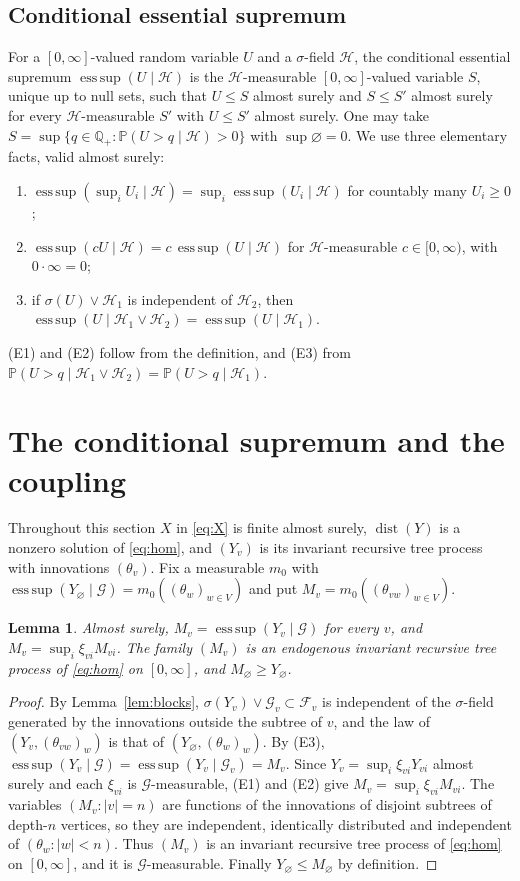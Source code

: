 \documentclass[11pt]{amsart}
\newtheorem{lemma}[theorem]{Lemma}
\theoremstyle{remark}
\newcommand{\Ga}{\mathcal{G}}
\newcommand{\cF}{\mathcal{F}}
\newcommand{\cH}{\mathcal{H}}
\newcommand{\Q}{\mathbb{Q}}
\newcommand{\Pb}{\mathbb{P}}
\newcommand{\esssup}{\operatorname*{ess\,sup}}
\newcommand{\dist}{\operatorname{dist}}
\begin{document}
\subsection{Conditional essential supremum}
For a $[0,\infty]$-valued random variable $U$ and a $\sigma$-field $\cH$, the conditional
essential supremum $\esssup(U\mid\cH)$ is the $\cH$-measurable $[0,\infty]$-valued
variable $S$, unique up to null sets, such that $U\le S$ almost surely and $S\le S'$
almost surely for every $\cH$-measurable $S'$ with $U\le S'$ almost surely. One may take
$S=\sup\{q\in\Q_+:\Pb(U>q\mid\cH)>0\}$ with $\sup\varnothing=0$. We use three elementary
facts, valid almost surely:
\begin{enumerate}
\item[(E1)] $\esssup(\sup_i U_i\mid\cH)=\sup_i\esssup(U_i\mid\cH)$ for countably many
$U_i\ge0$;
\item[(E2)] $\esssup(cU\mid\cH)=c\,\esssup(U\mid\cH)$ for $\cH$-measurable
$c\in[0,\infty)$, with $0\cdot\infty=0$;
\item[(E3)] if $\sigma(U)\vee\cH_1$ is independent of $\cH_2$, then
$\esssup(U\mid\cH_1\vee\cH_2)=\esssup(U\mid\cH_1)$.
\end{enumerate}
(E1) and (E2) follow from the definition, and (E3) from
$\Pb(U>q\mid\cH_1\vee\cH_2)=\Pb(U>q\mid\cH_1)$.

\section{The conditional supremum and the coupling}\label{sec:proof}

Throughout this section $X$ in \eqref{eq:X} is finite almost surely, $\dist(Y)$ is a
nonzero solution of \eqref{eq:hom}, and $(Y_v)$ is its invariant recursive tree process
with innovations $(\theta_v)$. Fix a measurable $m_0$ with
$\esssup(Y_\varnothing\mid\Ga)=m_0((\theta_w)_{w\in V})$ and put
$M_v=m_0((\theta_{vw})_{w\in V})$.

\begin{lemma}\label{lem:M}
Almost surely, $M_v=\esssup(Y_v\mid\Ga)$ for every $v$, and
$M_v=\sup_i\xi_{vi}M_{vi}$. The family $(M_v)$ is an endogenous invariant recursive tree
process of \eqref{eq:hom} on $[0,\infty]$, and $M_\varnothing\ge Y_\varnothing$.
\end{lemma}

\begin{proof}
By Lemma~\ref{lem:blocks}, $\sigma(Y_v)\vee\Ga_v\subset\cF_v$ is independent of the
$\sigma$-field generated by the innovations outside the subtree of $v$, and the law of
$(Y_v,(\theta_{vw})_w)$ is that of $(Y_\varnothing,(\theta_w)_w)$. By (E3),
$\esssup(Y_v\mid\Ga)=\esssup(Y_v\mid\Ga_v)=M_v$. Since
$Y_v=\sup_i\xi_{vi}Y_{vi}$ almost surely and each $\xi_{vi}$ is $\Ga$-measurable, (E1)
and (E2) give $M_v=\sup_i\xi_{vi}M_{vi}$. The variables $(M_v:|v|=n)$ are functions of
the innovations of disjoint subtrees of depth-$n$ vertices, so they are independent,
identically distributed and independent of $(\theta_w:|w|<n)$. Thus $(M_v)$ is an invariant
recursive tree process of \eqref{eq:hom} on $[0,\infty]$, and it is $\Ga$-measurable.
Finally $Y_\varnothing\le M_\varnothing$ by definition.
\end{proof}
\end{document}
